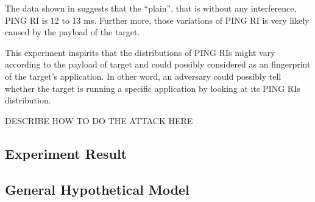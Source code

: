 The data shown in  suggests that the “plain”, that is without any interference, PING RI is 12 to 13 ms. Further more, those variations of  PING RI is very likely caused by the payload of the target.

This experiment inspirits that the distributions of PING RIs might vary according to the payload of target and could possibly considered as an fingerprint of the target’s application. In other word, an adversary could possibly tell whether the target is running a specific application by looking at its PING RIs distribution.

DESCRIBE HOW TO DO THE ATTACK HERE

\subsection{Experiment Result}

\subsection{General Hypothetical Model}